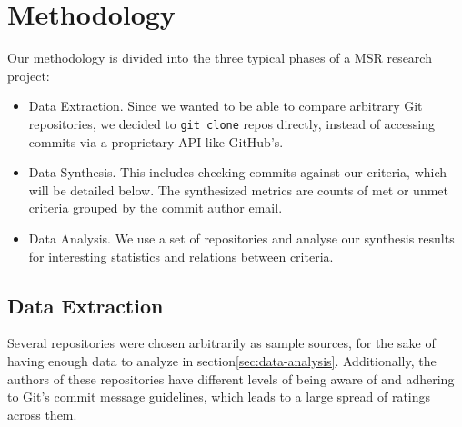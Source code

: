 \section{Methodology}
\label{sec:methodology}

Our methodology is divided into the three typical phases of a MSR research project:


\begin{itemize}
  \item Data Extraction. Since we wanted to be able to compare arbitrary Git repositories, we decided to \texttt{git clone} repos directly, instead of accessing commits via a proprietary API like GitHub's.
  \item Data Synthesis. This includes checking commits against our criteria, which will be detailed below. The synthesized metrics are counts of met or unmet criteria grouped by the commit author email.
  \item Data Analysis. We use a set of repositories and analyse our synthesis results for interesting statistics and relations between criteria.
\end{itemize}


\subsection{Data Extraction}
\label{sec:data-extraction}

Several repositories were chosen arbitrarily as sample sources, for the sake of having enough data to analyze in section\ref{sec:data-analysis}. Additionally, the authors of these repositories have different levels of being aware of and adhering to Git's commit message guidelines\cite{OffGuide}, which leads to a large spread of ratings across them.

